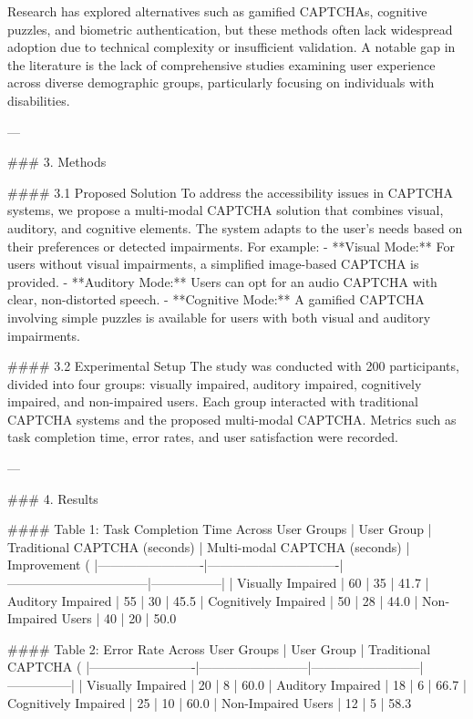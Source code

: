 Research has explored alternatives such as gamified CAPTCHAs, cognitive puzzles, and biometric authentication, but these methods often lack widespread adoption due to technical complexity or insufficient validation. A notable gap in the literature is the lack of comprehensive studies examining user experience across diverse demographic groups, particularly focusing on individuals with disabilities.  

---

### 3. Methods  

#### 3.1 Proposed Solution  
To address the accessibility issues in CAPTCHA systems, we propose a multi-modal CAPTCHA solution that combines visual, auditory, and cognitive elements. The system adapts to the user's needs based on their preferences or detected impairments. For example:  
- **Visual Mode:** For users without visual impairments, a simplified image-based CAPTCHA is provided.  
- **Auditory Mode:** Users can opt for an audio CAPTCHA with clear, non-distorted speech.  
- **Cognitive Mode:** A gamified CAPTCHA involving simple puzzles is available for users with both visual and auditory impairments.  

#### 3.2 Experimental Setup  
The study was conducted with 200 participants, divided into four groups: visually impaired, auditory impaired, cognitively impaired, and non-impaired users. Each group interacted with traditional CAPTCHA systems and the proposed multi-modal CAPTCHA. Metrics such as task completion time, error rates, and user satisfaction were recorded.  

---

### 4. Results  

#### Table 1: Task Completion Time Across User Groups  
| User Group             | Traditional CAPTCHA (seconds) | Multi-modal CAPTCHA (seconds) | Improvement (%
|-------------------------|-------------------------------|---------------------------------|-----------------|  
| Visually Impaired       | 60                           | 35                              | 41.7%
| Auditory Impaired       | 55                           | 30                              | 45.5%
| Cognitively Impaired    | 50                           | 28                              | 44.0%
| Non-Impaired Users      | 40                           | 20                              | 50.0%

#### Table 2: Error Rate Across User Groups  
| User Group             | Traditional CAPTCHA (%
|-------------------------|--------------------------|--------------------------|---------------|  
| Visually Impaired       | 20                      | 8                        | 60.0%
| Auditory Impaired       | 18                      | 6                        | 66.7%
| Cognitively Impaired    | 25                      | 10                       | 60.0%
| Non-Impaired Users      | 12                      | 5                        | 58.3%

